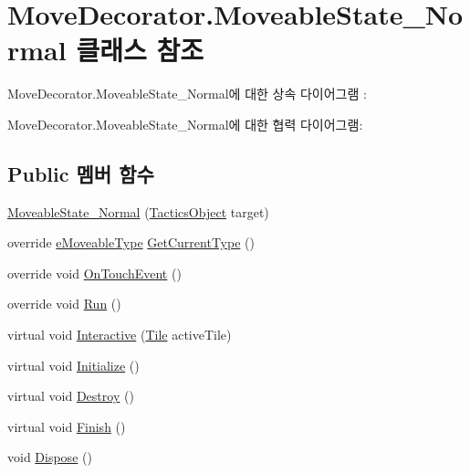 \hypertarget{class_move_decorator_1_1_moveable_state___normal}{}\section{Move\+Decorator.\+Moveable\+State\+\_\+\+Normal 클래스 참조}
\label{class_move_decorator_1_1_moveable_state___normal}


Move\+Decorator.\+Moveable\+State\+\_\+\+Normal에 대한 상속 다이어그램 \+: 


Move\+Decorator.\+Moveable\+State\+\_\+\+Normal에 대한 협력 다이어그램\+:
\subsection*{Public 멤버 함수}
\begin{DoxyCompactItemize}
\item 
\hyperlink{class_move_decorator_1_1_moveable_state___normal_a05b09dff07f87e452a660049929804ea}{Moveable\+State\+\_\+\+Normal} (\hyperlink{class_tactics_object}{Tactics\+Object} target)
\item 
override \hyperlink{_move_decorator_8cs_a90215797ba850e199f3ef63d7c56f132}{e\+Moveable\+Type} \hyperlink{class_move_decorator_1_1_moveable_state___normal_accc4ab296d5b1c1cf0f465b9a2b5f2dd}{Get\+Current\+Type} ()
\item 
override void \hyperlink{class_move_decorator_1_1_moveable_state___normal_a25b9dab13f2acd558ccadd0e98273f90}{On\+Touch\+Event} ()
\item 
override void \hyperlink{class_move_decorator_1_1_moveable_state___normal_a9e4e591aa61c13840a15facffa2148d6}{Run} ()
\item 
virtual void \hyperlink{class_move_decorator_1_1_moveable_state_a1e66885aa7daf1021fc654b706b53ab8}{Interactive} (\hyperlink{class_tile}{Tile} active\+Tile)
\item 
virtual void \hyperlink{class_m_c_n_1_1_state_a5be59bc891e64cbbe4322d74a6746908}{Initialize} ()
\item 
virtual void \hyperlink{class_m_c_n_1_1_state_aebf48ef248bbf185d6aae91d9789459e}{Destroy} ()
\item 
virtual void \hyperlink{class_m_c_n_1_1_state_a2492ca731678b8216c02134dddeeb745}{Finish} ()
\item 
void \hyperlink{class_m_c_n_1_1_state_af6df0477e0dead784489688cb2c2093e}{Dispose} ()
\end{DoxyCompactItemize}
